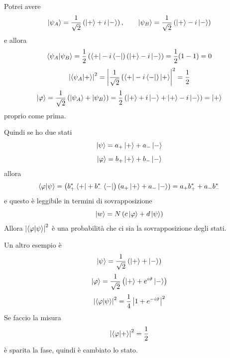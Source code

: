 \bigskip
\noindent
Potrei avere
\[
  \ket{\psi_A}
  = \frac{1}{\sqrt{2}} \left( \ket{+} + i \ket{-} \right), \qquad \ket{\psi_B}
  = \frac{1}{\sqrt{2}} \left( \ket{+} - i \ket{-} \right)
\]
e allora
\[
  \braket{\psi_A|\psi_B}
  = \frac{1}{2} \left( \bra{+} - i \bra{-} \right)
    \left( \ket{+} - i \ket{-} \right)
  = \frac{1}{2} (1 - 1) = 0
\]
\[
  \left| \braket{\psi_A|+} \right|^2
  = \left|
    \frac{1}{\sqrt{2}} \left( \bra{+} - i \bra{-} \right) \ket{+}
  \right|^2
  = \frac{1}{2}
\]
\[
  \ket{\varphi}
  = \frac{1}{\sqrt{2}} \left( \ket{\psi_A} + \ket{\psi_B} \right)
  = \frac{1}{2} \left( \ket{+} + i \ket{-} + \ket{+} - i \ket{-} \right)
  = \ket{+}
\]
proprio come prima.

\bigskip
\noindent
Quindi se ho due stati
\[
  \ket{\psi} = a_+ \ket{+} + a_- \ket{-}
\]
\[
  \ket{\varphi} = b_+ \ket{+} + b_- \ket{-}
\]
allora
\[
  \braket{\varphi|\psi}
  = \left( b_+^* \bra{+} + b_-^* \bra{-} \right)
    \left( a_+ \ket{+} + a_- \ket{-} \right)
  = a_+ b_+^* + a_- b_-^*
\]
e questo è leggibile in termini di sovrapposizione
\[
  \ket{w} = N \left( c \ket{\varphi} + d \ket{\psi} \right)
\]
Allora \(\left| \braket{\varphi|\psi} \right|^2\) è una probabilità che ci sia
la sovrapposizione degli stati.

\bigskip
\noindent
Un altro esempio è
\[
  \ket{\psi} = \frac{1}{\sqrt{2}} \left( \ket{+} + \ket{-} \right)
\]
\[
  \ket{\varphi} = \frac{1}{\sqrt{2}} \left(
    \ket{+} + e^{i \vartheta} \ket{-}
  \right)
\]
\[
  \left| \braket{\varphi|\psi} \right|^2
  = \frac{1}{4} \left| 1 + e^{-i \vartheta} \right|^2
\]
Se faccio la misura
\[
  \left| \braket{\varphi|+} \right|^2 = \frac{1}{2}
\]
è sparita la fase, quindi è cambiato lo stato.